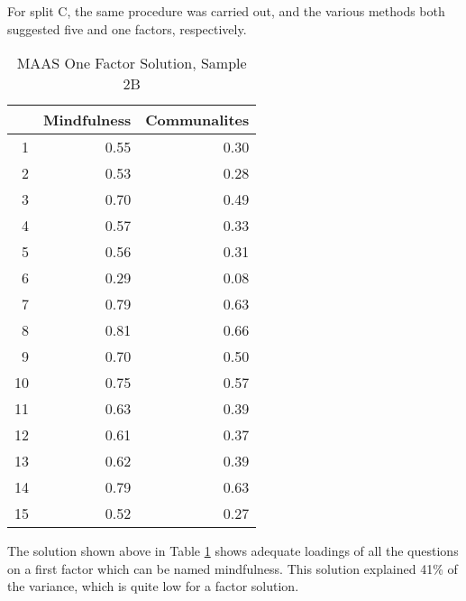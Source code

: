 \documentclass{article}
\begin{document}
For split C, the same procedure was carried out, and the various methods both suggested five and one factors, respectively. 




\begin{table}[ht]
\centering
\begin{tabular}{rrr}
  \hline
 & Mindfulness & Communalites \\ 
  \hline
1 & 0.55 & 0.30 \\ 
  2 & 0.53 & 0.28 \\ 
  3 & 0.70 & 0.49 \\ 
  4 & 0.57 & 0.33 \\ 
  5 & 0.56 & 0.31 \\ 
  6 & 0.29 & 0.08 \\ 
  7 & 0.79 & 0.63 \\ 
  8 & 0.81 & 0.66 \\ 
  9 & 0.70 & 0.50 \\ 
  10 & 0.75 & 0.57 \\ 
  11 & 0.63 & 0.39 \\ 
  12 & 0.61 & 0.37 \\ 
  13 & 0.62 & 0.39 \\ 
  14 & 0.79 & 0.63 \\ 
  15 & 0.52 & 0.27 \\ 
   \hline
\end{tabular}
\caption{MAAS One Factor Solution, Sample 2B} 
\label{tab:maas2bfact1}
\end{table}
The solution shown above in Table \ref{tab:maas2bfact1} shows adequate loadings of all the questions on a first factor which can be named mindfulness.  This solution explained 41\% of the variance, which is quite low for a factor solution.
\end{document}

